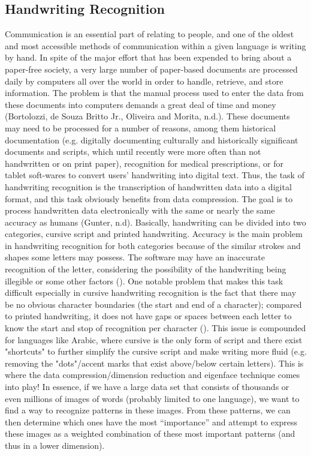 \documentclass[12pt]{extarticle}
\begin{document}
    \subsection{Handwriting Recognition}
    Communication is an essential part of relating to people, and one of the oldest and most accessible methods of communication within a given language is writing by hand. In spite of the major effort that has been expended to bring about a paper-free society, a very large number of paper-based documents are processed daily by computers all over the world in order to handle, retrieve, and store information. The problem is that the manual process used to enter the data from these documents into computers demands a great deal of time and money (Bortolozzi, de Souza Britto Jr., Oliveira and Morita, n.d.). These documents may need to be processed for a number of reasons, among them historical documentation (e.g. digitally documenting culturally and historically significant documents and scripts, which until recently were more often than not handwritten or on print paper), recognition for medical prescriptions, or for tablet soft-wares to convert users’ handwriting into digital text.
    \newline
    \indent Thus, the task of handwriting recognition is the transcription of handwritten data into a digital format, and this task obviously benefits from data compression. The goal is to process handwritten data electronically with the same or nearly the same accuracy as humans (Gunter, n.d). 
    \newline
    \indent Basically, handwriting can be divided into two categories, cursive script and printed handwriting. Accuracy is the main problem in handwriting recognition for both categories because of the similar strokes and shapes some letters may possess. The software may have an inaccurate recognition of the letter, considering the possibility of the handwriting being illegible or some other factors (). One notable problem that makes this task difficult especially in cursive handwriting recognition is the fact that there may be no obvious character boundaries (the start and end of a character); compared to printed handwriting, it does not have gaps or spaces between each letter to know the start and stop of recognition per character (). This issue is compounded for languages like Arabic, where cursive is the only form of script and there exist "shortcuts" to further simplify the cursive script and make writing more fluid (e.g. removing the "dots"/accent marks that exist above/below certain letters).
    \newline
    \indent This is where the data compression/dimension reduction and eigenface technique comes into play! In essence, if we have a large data set that consists of thousands or even millions of images of words (probably limited to one language), we want to find a way to recognize patterns in these images. From these patterns, we can then determine which ones have the most “importance” and attempt to express these images as a weighted combination of these most important patterns (and thus in a lower dimension).
    
\end{document}
